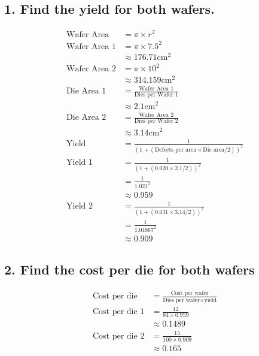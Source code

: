 \documentclass[11pt]{article}
\begin{document}
\subsection*{\small 1. Find the yield for both wafers.}
\begin{align*}
\textrm{Wafer Area} & = \pi \times r^2\\
\textrm{Wafer Area 1} & = \pi \times 7.5^2\\
& \approx 176.71 \textrm{cm}^2\\
\textrm{Wafer Area 2} & = \pi \times 10^2\\
& \approx 314.159 \textrm{cm}^2\\
\textrm{Die Area 1} & = \frac{\textrm{Wafer Area 1}}{\textrm{Dies per Wafer 1}}\\
& \approx 2.1 \textrm{cm}^2\\
\textrm{Die Area 2} & = \frac{\textrm{Wafer Area 2}}{\textrm{Dies per Wafer 2}}\\
& \approx 3.14 \textrm{cm}^2\\
\textrm{Yield} & = \frac{1}{(1 + (\textrm{Defects per area} \times \textrm{Die area}/2))^2}\\
\textrm{Yield 1} & = \frac{1}{(1 + (0.020 \times 2.1/2))^2}\\
& = \frac{1}{1.021^2}\\
& \approx \boldsymbol{0.959}\\
\textrm{Yield 2} & = \frac{1}{(1 + (0.031 \times 3.14/2))^2}\\
& = \frac{1}{1.04867^2}\\
& \approx \boldsymbol{0.909}
\end{align*}

\subsection*{\small 2. Find the cost per die for both wafers}
\begin{align*}
\textrm{Cost per die} & = \frac{\textrm{Cost per wafer}}{\textrm{Dies per wafer} \times \textrm{yield}}\\
\textrm{Cost per die 1} & = \frac{12}{84 \times 0.959}\\
& \approx \boldsymbol{0.1489} \\ 
\textrm{Cost per die 2} & = \frac{15}{100 \times 0.909}\\
& \approx \boldsymbol{0.165}
\end{align*}
\end{document}
